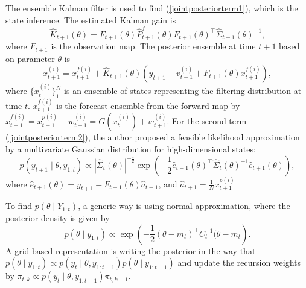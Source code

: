 The ensemble Kalman filter is used to find (\ref{jointposteriorterm1}), which is the state inference. The estimated Kalman gain is 
\begin{equation*}
\hat{K}_{t+1}(\theta) = F_{t+1}(\theta)\hat{P}_{t+1}^f(\theta)F_{t+1}(\theta)^\top \hat{\Sigma}_{t+1}(\theta)^{-1},
\end{equation*}
where $F_{t+1}$ is the observation map. The posterior ensemble at time $t+1$ based on parameter $\theta$ is
\begin{equation}\label{ensembleKalmanForecast}
x_{t+1}^{(i)} = x_{t+1}^{f(i)}+\hat{K}_{t+1}(\theta)(y_{t+1}+v_{t+1}^{(i)}+F_{t+1}(\theta)x_{t+1}^{f(i)}), 
\end{equation}
where $\{x_{t}^{(i)}\}_1^N$ is an ensemble of states representing the filtering distribution at time $t$. $x_{t+1}^{f(i)}$ is the forecast ensemble from the forward map by $x_{t+1}^{f(i)} = x_{t+1}^{p(i)} +w_{t+1}^{(i)}= G(x_{t}^{(i)})+w_{t+1}^{(i)}$. For the second term (\ref{jointposteriorterm2}), the author \cite{stroud2016bayesian} proposed a feasible likelihood approximation by a multivariate Gaussian distribution \cite{mitchell2000adaptive} for high-dimensional states: 
\begin{equation}\label{esembleKalmanLikeli}
p(y_{t+1}\mid\theta,y_{1:t})\propto \left| \hat{\Sigma}_t(\theta)  \right|^{-\frac{1}{2}} \exp \left( -\frac{1}{2} \hat{e}_{t+1}(\theta)^\top \hat{\Sigma}_t(\theta)^{-1} \hat{e}_{t+1}(\theta) \right),
\end{equation}
where $\hat{e}_{t+1}(\theta) = y_{t+1}-F_{t+1}(\theta)\hat{a}_{t+1}$, and $\hat{a}_{t+1}=\frac{1}{N}x_{t+1}^{p(i)}$

To find $p(\theta\mid Y_{1:t})$, a generic way is using normal approximation, where the posterior density  is given by 
\begin{equation*}
p(\theta\mid y_{1:t}) \propto \exp \left(  -\frac{1}{2}(\theta-m_t)^\top C_t^{-1}(\theta-m_t  \right).
\end{equation*}
A grid-based representation is writing the posterior in the way that $p(\theta\mid y_{1:t}) \propto p(y_t\mid\theta,y_{1:t-1})p(\theta\mid y_{1:t-1})$ and update the recursion weights by $\pi_{t,k}\propto p(y_{t}\mid\theta,y_{1:t-1})\pi_{t,k-1}$. 

